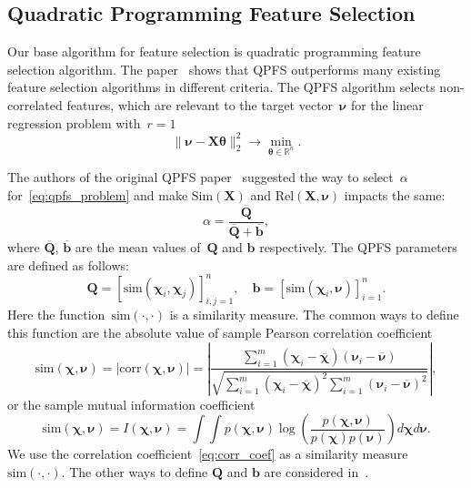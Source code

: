 \documentclass[12pt,oneside]{article}
\theoremstyle{definition}
\newcommand{\bb}{\mathbf{b}}
\newcommand{\bX}{\mathbf{X}}
\newcommand{\bQ}{\mathbf{Q}}
\newcommand{\bbR}{\mathbb{R}}
\newcommand{\bchi}{\boldsymbol{\chi}}
\newcommand{\bnu}{\boldsymbol{\nu}}
\newcommand{\btheta}{\boldsymbol{\theta}}
\begin{document}
\subsection{Quadratic Programming Feature Selection}
Our base algorithm for feature selection is quadratic programming feature selection algorithm. 
The paper~\cite{katrutsa2017comprehensive} shows that QPFS outperforms many existing feature selection algorithms in different criteria.
The QPFS algorithm selects non-correlated features, which are relevant to the target vector~$\bnu$ for the linear regression problem with~$r=1$
\begin{equation}
	\| \bnu - \bX \btheta\|_2^2 \rightarrow\min_{\btheta \in \bbR^{n}}.
\end{equation}

The authors of the original QPFS paper~\cite{rodriguez2010quadratic} suggested the way to select~$\alpha$ for~\eqref{eq:qpfs_problem} and make $\text{Sim}(\bX)$ and $\text{Rel}(\bX, \bnu)$ impacts the same:
\begin{equation}
	\alpha = \frac{\overline{\bQ}}{\overline{\bQ} + \overline{\bb}},
\end{equation}
where $\overline{\bQ}$, $\overline{\bb}$ are the mean values of~$\bQ$ and $\bb$ respectively. The QPFS parameters are defined as follows:
\begin{equation}
	\bQ = \left[\text{sim}(\bchi_i, \bchi_j)\right]_{i,j=1}^n, \quad \bb = \left[\text{sim}(\bchi_i, \bnu)\right]_{i=1}^n.
	\label{eq:qpfs_1d_qb}
\end{equation}
Here the function~$\text{sim}(\cdot, \cdot)$ is a similarity measure.
The common ways to define this function are the absolute value of sample Pearson correlation coefficient
\begin{equation}
	\text{sim}(\bchi, \bnu) = |\text{corr}(\bchi, \bnu)| = \left|\frac{\sum_{i=1}^m(\bchi_i - \overline{\bchi})( \bnu_i - \overline{\bnu})}{\sqrt{\sum_{i=1}^m(\bchi_i - \overline{\bchi})^2\sum_{i=1}^m(\bnu_i - \overline{\bnu})^2}}\right|,
	\label{eq:corr_coef}
\end{equation}
or the sample mutual information coefficient
\begin{equation}
\text{sim}(\bchi, \bnu) = I(\bchi, \bnu) = \int \int p(\bchi, \bnu) \log(\frac{p(\bchi, \bnu)}{p(\bchi)p(\bnu)}) d\bchi d\bnu.
\end{equation}
We use the correlation coefficient~\eqref{eq:corr_coef} as a similarity measure~$\text{sim}(\cdot, \cdot)$.
The other ways to define $\bQ$ and $\bb$ are considered in~\cite{katrutsa2017comprehensive}.
\end{document}
